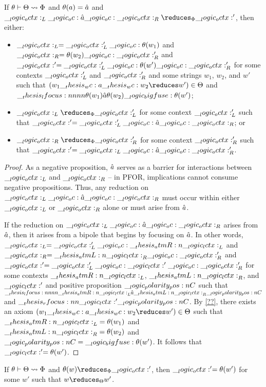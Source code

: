 \begin{theorem}[Soundness]
  If $\theta \vdash \Theta \rightsquigarrow \Phi$ and $\theta(a) = \hat{a}$ and $\octx_L \oc \defp{a} \oc \octx_R \reduces_{\orsig} \octx'$, then either:
  \begin{itemize}
  \item $\__logic_octx:_L = \__logic_octx:'_L \__logic_oc: \theta(w_1)$ and $\__logic_octx:_R = \theta(w_2) \__logic_oc: \__logic_octx:'_R$ and $\__logic_octx:' = \__logic_octx:'_L \__logic_oc: \theta(w') \__logic_oc: \__logic_octx:'_R$ for some contexts $\__logic_octx:'_L$ and $\__logic_octx:'_R$ and some strings $w_1$, $w_2$, and $w'$ such that $(w_1 \wc a \wc w_2 \reduces w') \in \srsig$ and $\__thesis_lfocus:nnnn {\theta(w_1)} {\hat{a}} {\theta(w_2)} {\__logic_bigfuse: \theta(w')}$;
  \item $\octx_L \reduces_{\orsig} \octx'_L$ for some context $\__logic_octx:'_L$ such that $\__logic_octx:' = \__logic_octx:'_L \__logic_oc: \hat{a} \__logic_oc: \__logic_octx:_R$; or
  \item $\octx_R \reduces_{\orsig} \octx'_R$ for some context $\__logic_octx:'_R$ such that $\__logic_octx:' = \__logic_octx:_L \__logic_oc: \hat{a} \__logic_oc: \__logic_octx:'_R$.
  \end{itemize}
\end{theorem}
\begin{proof}
  As a negative proposition, $\hat{a}$ serves as a barrier for interactions between $\__logic_octx:_L$ and $\__logic_octx:_R$ -- in \ac{PFOR}, implications cannot consume negative propositions.
  Thus, any reduction on $\__logic_octx:_L \__logic_oc: \hat{a} \__logic_oc: \__logic_octx:_R$ must occur within either $\__logic_octx:_L$ or $\__logic_octx:_R$ alone or must arise from $\hat{a}$.

  If the reduction on $\__logic_octx:_L \__logic_oc: \hat{a} \__logic_oc: \__logic_octx:_R$ arises from $\hat{a}$, then it arises from a bipole that begins by focusing on $\hat{a}$.
  In other words, $\__logic_octx:_L = \__logic_octx:'_L \__logic_oc: \__thesis_atmR:n {\__logic_lctx:}_L$ and $\__logic_octx:_R = \__thesis_atmL:n {\__logic_lctx:}_R \__logic_oc: \__logic_octx:'_R$ and $\__logic_octx:' = \__logic_octx:'_L \__logic_oc: \__logic_lctx:' \__logic_oc: \__logic_octx:'_R$ for some contexts $\__thesis_atmR:n {\__logic_lctx:}_L$, $\__thesis_atmL:n {\__logic_lctx:}_R$, and $\__logic_lctx:'$ and positive proposition $\__logic_polarity_pos:n {C}$ such that $\__thesis_lfocus:nnnn {\__thesis_atmR:n {\__logic_lctx:}_L} {\hat{a}} {\__thesis_atmL:n {\__logic_lctx:}_R} {\__logic_polarity_pos:n {C}}$ and $\__thesis_rfocus:nn {\__logic_lctx:'} {\__logic_polarity_pos:n {C}}$.
  By \cref{??}, there exists an axiom $(w_1 \wc a \wc w_2 \reduces w') \in \srsig$ such that $\__thesis_atmR:n {\__logic_lctx:}_L = \theta(w_1)$ and $\__thesis_atmL:n {\__logic_lctx:}_R = \theta(w_2)$ and $\__logic_polarity_pos:n {C} = \__logic_bigfuse: \theta(w')$.
  It follows that $\__logic_lctx:' = \theta(w')$.
\end{proof}

\begin{corollary}[Soundness]
  If $\theta \vdash \Theta \rightsquigarrow \Phi$ and $\theta(w) \reduces_{\orsig} \octx'$, then $\__logic_octx:' = \theta(w')$ for some $w'$ such that $w \reduces_{\srsig} w'$.
\end{corollary}


